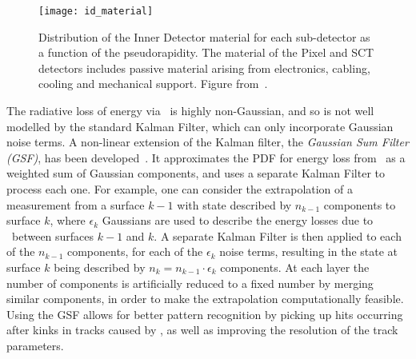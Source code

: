\begin{figure}[h]
\centering
            \texttt{[image: id\_material]}
\caption[Distribution of the Inner Detector material for each sub-detector as a
function of the pseudorapidity.]{
Distribution of the Inner Detector material for each sub-detector as a
function of the pseudorapidity. The material of the Pixel and SCT detectors
includes passive material arising from electronics, cabling, cooling and
mechanical support. Figure from~\cite{ATLAS-CONF-2012-047}.}
\label{fig:id-material}
\end{figure}


The radiative loss of energy via \brem\ is highly non-Gaussian, and so is not
well modelled by the standard Kalman Filter, which can only incorporate Gaussian
noise terms. A non-linear extension of the
Kalman filter, the {\it Gaussian Sum Filter (GSF)}, has been
developed~\cite{Fruhwirth2003131,Atkinson:1448253}. It
approximates the PDF for energy loss from \brem\ as a weighted sum of Gaussian
components, and uses a separate Kalman Filter to process each one. For example,
one can consider the extrapolation of a measurement from a surface $k-1$ with state
described by $n_{k-1}$ components to surface $k$, where $\epsilon_{k}$ Gaussians
are used to describe the energy losses due to \brem\ between surfaces $k-1$ and
$k$. A separate Kalman Filter is then applied to each of the $n_{k-1}$
components, for each of the $\epsilon_{k}$ noise terms, resulting in the state at
surface $k$ being described by $n_{k} = n_{k-1} \cdot \epsilon_{k}$ components.
At each layer the number of components is artificially reduced to a fixed number
by merging similar components,
in order to make the extrapolation computationally feasible.
Using the GSF allows for better pattern recognition by picking up hits
occurring after kinks in tracks caused by \brem, as well as improving the
resolution of the track parameters.


